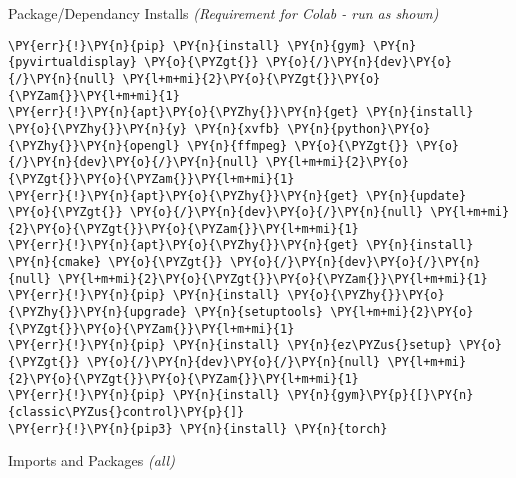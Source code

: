     
    Package/Dependancy Installs \emph{(Requirement for Colab - run as
shown)}

    \begin{tcolorbox}[breakable, size=fbox, boxrule=1pt, pad at break*=1mm,colback=cellbackground, colframe=cellborder]
\begin{Verbatim}[commandchars=\\\{\}]
\PY{err}{!}\PY{n}{pip} \PY{n}{install} \PY{n}{gym} \PY{n}{pyvirtualdisplay} \PY{o}{\PYZgt{}} \PY{o}{/}\PY{n}{dev}\PY{o}{/}\PY{n}{null} \PY{l+m+mi}{2}\PY{o}{\PYZgt{}}\PY{o}{\PYZam{}}\PY{l+m+mi}{1}
\PY{err}{!}\PY{n}{apt}\PY{o}{\PYZhy{}}\PY{n}{get} \PY{n}{install} \PY{o}{\PYZhy{}}\PY{n}{y} \PY{n}{xvfb} \PY{n}{python}\PY{o}{\PYZhy{}}\PY{n}{opengl} \PY{n}{ffmpeg} \PY{o}{\PYZgt{}} \PY{o}{/}\PY{n}{dev}\PY{o}{/}\PY{n}{null} \PY{l+m+mi}{2}\PY{o}{\PYZgt{}}\PY{o}{\PYZam{}}\PY{l+m+mi}{1}
\PY{err}{!}\PY{n}{apt}\PY{o}{\PYZhy{}}\PY{n}{get} \PY{n}{update} \PY{o}{\PYZgt{}} \PY{o}{/}\PY{n}{dev}\PY{o}{/}\PY{n}{null} \PY{l+m+mi}{2}\PY{o}{\PYZgt{}}\PY{o}{\PYZam{}}\PY{l+m+mi}{1}
\PY{err}{!}\PY{n}{apt}\PY{o}{\PYZhy{}}\PY{n}{get} \PY{n}{install} \PY{n}{cmake} \PY{o}{\PYZgt{}} \PY{o}{/}\PY{n}{dev}\PY{o}{/}\PY{n}{null} \PY{l+m+mi}{2}\PY{o}{\PYZgt{}}\PY{o}{\PYZam{}}\PY{l+m+mi}{1}
\PY{err}{!}\PY{n}{pip} \PY{n}{install} \PY{o}{\PYZhy{}}\PY{o}{\PYZhy{}}\PY{n}{upgrade} \PY{n}{setuptools} \PY{l+m+mi}{2}\PY{o}{\PYZgt{}}\PY{o}{\PYZam{}}\PY{l+m+mi}{1}
\PY{err}{!}\PY{n}{pip} \PY{n}{install} \PY{n}{ez\PYZus{}setup} \PY{o}{\PYZgt{}} \PY{o}{/}\PY{n}{dev}\PY{o}{/}\PY{n}{null} \PY{l+m+mi}{2}\PY{o}{\PYZgt{}}\PY{o}{\PYZam{}}\PY{l+m+mi}{1}
\PY{err}{!}\PY{n}{pip} \PY{n}{install} \PY{n}{gym}\PY{p}{[}\PY{n}{classic\PYZus{}control}\PY{p}{]}
\PY{err}{!}\PY{n}{pip3} \PY{n}{install} \PY{n}{torch}
\end{Verbatim}
\end{tcolorbox}

    Imports and Packages \emph{(all)}

